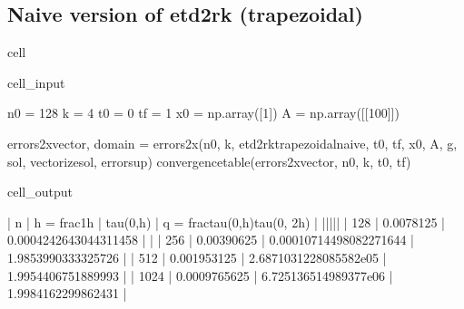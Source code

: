 \documentclass[letterpaper,10pt,english]{jupyterBook}
\begin{document}
\subsection{Naive version of etd2rk (trapezoidal)}
\label{\detokenize{appendix:naive-version-of-etd2rk-trapezoidal}}
\begin{sphinxuseclass}{cell}\begin{sphinxVerbatimInput}

\begin{sphinxuseclass}{cell_input}
\begin{sphinxVerbatim}[commandchars=\\\{\}]
n0 = 128
k = 4
t0 = 0
tf = 1
x0 = np.array([1])
A = np.array([[100]])

errors\PYGZus{}2x\PYGZus{}vector, domain = errors\PYGZus{}2x(n0, k, etd2rk\PYGZus{}trapezoidal\PYGZus{}naive, t0, tf, x0, A, g, sol, vectorize\PYGZus{}sol, error\PYGZus{}sup)
convergence\PYGZus{}table(errors\PYGZus{}2x\PYGZus{}vector, n0, k, t0, tf)
\end{sphinxVerbatim}

\end{sphinxuseclass}\end{sphinxVerbatimInput}
\begin{sphinxVerbatimOutput}

\begin{sphinxuseclass}{cell_output}
\begin{sphinxVerbatim}[commandchars=\\\{\}]
| n | h = \PYGZdl{}\PYGZbs{}frac\PYGZob{}1\PYGZcb{}\PYGZob{}h\PYGZcb{}\PYGZdl{} | \PYGZdl{}\PYGZbs{}tau(0,h)\PYGZdl{} | q = \PYGZdl{}\PYGZbs{}frac\PYGZob{}tau(0,h)\PYGZcb{}\PYGZob{}tau(0, 2h)\PYGZcb{}\PYGZdl{} |
|\PYGZhy{}\PYGZhy{}\PYGZhy{}|\PYGZhy{}\PYGZhy{}\PYGZhy{}\PYGZhy{}\PYGZhy{}\PYGZhy{}\PYGZhy{}\PYGZhy{}\PYGZhy{}\PYGZhy{}\PYGZhy{}\PYGZhy{}\PYGZhy{}\PYGZhy{}\PYGZhy{}\PYGZhy{}\PYGZhy{}|\PYGZhy{}\PYGZhy{}\PYGZhy{}\PYGZhy{}\PYGZhy{}\PYGZhy{}\PYGZhy{}\PYGZhy{}\PYGZhy{}\PYGZhy{}\PYGZhy{}|\PYGZhy{}\PYGZhy{}\PYGZhy{}\PYGZhy{}\PYGZhy{}\PYGZhy{}\PYGZhy{}\PYGZhy{}\PYGZhy{}\PYGZhy{}\PYGZhy{}\PYGZhy{}\PYGZhy{}\PYGZhy{}\PYGZhy{}\PYGZhy{}\PYGZhy{}\PYGZhy{}\PYGZhy{}\PYGZhy{}\PYGZhy{}\PYGZhy{}\PYGZhy{}\PYGZhy{}\PYGZhy{}\PYGZhy{}\PYGZhy{}\PYGZhy{}\PYGZhy{}\PYGZhy{}\PYGZhy{}\PYGZhy{}\PYGZhy{}|
 | 128 | 0.0078125 | 0.0004242643044311458 | \PYGZhy{} | 
 | 256 | 0.00390625 | 0.00010714498082271644 | 1.9853990333325726 | 
 | 512 | 0.001953125 | 2.6871031228085582e\PYGZhy{}05 | 1.9954406751889993 | 
 | 1024 | 0.0009765625 | 6.725136514989377e\PYGZhy{}06 | 1.9984162299862431 | 
\end{sphinxVerbatim}

\end{sphinxuseclass}\end{sphinxVerbatimOutput}

\end{sphinxuseclass}
\end{document}
